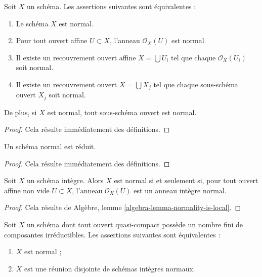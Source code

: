 \begin{lemma}
\label{lemma-locally-normal}
Soit $X$ un schéma. Les assertions suivantes sont équivalentes :
\begin{enumerate}
\item Le schéma $X$ est normal.
\item Pour tout ouvert affine $U \subset X$, l'anneau $\mathcal{O}_X(U)$
est normal.
\item Il existe un recouvrement ouvert affine $X = \bigcup U_i$ tel que
chaque $\mathcal{O}_X(U_i)$ soit normal.
\item Il existe un recouvrement ouvert $X = \bigcup X_j$
tel que chaque sous-schéma ouvert $X_j$ soit normal.
\end{enumerate}
De plus, si $X$ est normal, tout sous-schéma ouvert
est normal.
\end{lemma}

\begin{proof}
Cela résulte immédiatement des définitions.
\end{proof}

\begin{lemma}
\label{lemma-normal-reduced}
Un schéma normal est réduit.
\end{lemma}

\begin{proof}
Cela résulte immédiatement des définitions.
\end{proof}

\begin{lemma}
\label{lemma-integral-normal}
Soit $X$ un schéma intègre.
Alors $X$ est normal si et seulement si, pour tout ouvert affine non vide
$U \subset X$, l'anneau $\mathcal{O}_X(U)$ est un anneau intègre normal.
\end{lemma}

\begin{proof}
Cela résulte de
Algèbre, lemme \ref{algebra-lemma-normality-is-local}.
\end{proof}

\begin{lemma}
\label{lemma-normal-locally-finite-nr-irreducibles}
Soit $X$ un schéma dont tout ouvert quasi-compact possède un nombre fini
de composantes irréductibles. Les assertions suivantes sont équivalentes :
\begin{enumerate}
\item $X$ est normal ;
\item $X$ est une réunion disjointe de schémas intègres normaux.
\end{enumerate}
\end{lemma}

